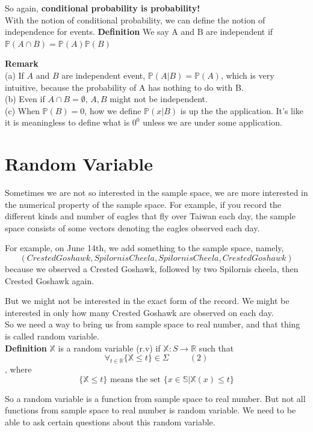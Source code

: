 \documentclass[a4paper,12pt]{article}
\begin{document}
So again, \textbf{conditional probability is probability!}\\

With the notion of conditional probability, we can define the notion of independence for events.
\textbf{Definition} We say A and B are independent if $\mathbb{P}(A \cap B) = \mathbb{P}(A) \mathbb{P}(B)$

\textbf{Remark}\\
(a) If $A$ and $B$ are independent event, $\mathbb{P}(A|B) = \mathbb{P}(A)$, which is very intuitive, because the probability of A has nothing to do with B.\\
(b) Even if $A \cap B = \emptyset$, $A, B$ might not be independent.\\
(c) When $\mathbb{P}(B) = 0$, how we define $\mathbb{P}(x|B)$ is up the the application. It's like it is meaningless to define what is $0^0$ unless we are under some application.\\

\newpage
\section{Random Variable}
Sometimes we are not so interested in the sample space, we are more interested in the numerical property of the sample space. For example, if you record the different kinds and number of eagles that fly over Taiwan each day, the sample space consists of some vectors denoting the eagles observed each day.

For example, on June 14th, we add something to the sample space, namely, $$( Crested Goshawk, Spilornis Cheela, Spilornis Cheela, Crested Goshawk )$$
because we observed a Crested Goshawk, followed by two Spilornis cheela, then Crested Goshawk again.

But we might not be interested in the exact form of the record. We might be interested in only how many Crested Goshawk are observed on each day.\\

So we need a way to bring us from sample space to real number, and that thing is called random variable.\\

\textbf{Definition} 
$\mathbb{X}$ is a random variable (r.v) if
$\mathbb{X}: S \to \mathbb{R}$
such that
$$\forall_{t\in\mathbb{R}}\{\mathbb{X}\leq t\}\in \Sigma\ \ \ \ \ \ \ \ \ \ \ (2)$$
, where
$$\{\mathbb{X} \leq t\} \text{ means the set } \{x \in \mathbb{S} | \mathbb{X}(x) \leq t\}$$

So a random variable is a function from sample space to real number. But not all functions from sample space to real number is random variable. We need to be able to ask certain questions about this random variable. 
\end{document}
